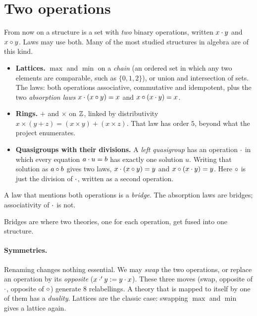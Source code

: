\documentclass[11pt,a4paper]{article}
\begin{document}
\section{Two operations}\label{sec:two}

From now on a structure is a set with \emph{two} binary operations, written $x\cdot y$ and $x\circ y$. Laws may use
both. Many of the most studied structures in algebra are of this kind.
\begin{itemize}
\item \textbf{Lattices.} $\max$ and $\min$ on a \emph{chain} (an ordered set in which any two elements are
  comparable, such as $\{0,1,2\}$), or union and intersection of sets. The
  laws: both operations associative, commutative and idempotent, plus the two \emph{absorption laws}
  $x\cdot(x\circ y)=x$ and $x\circ(x\cdot y)=x$.
\item \textbf{Rings.} $+$ and $\times$ on $\mathbb{Z}$, linked by distributivity $x\times(y+z)=(x\times y)+(x\times z)$. That
  law has order $5$, beyond what the project enumerates.
\item \textbf{Quasigroups with their divisions.} A \emph{left quasigroup} has an operation $\cdot$ in which every
  equation $a\cdot u=b$ has exactly one solution $u$. Writing that solution as $a\circ b$ gives two laws,
  $x\cdot(x\circ y)=y$ and $x\circ(x\cdot y)=y$. Here $\circ$ is just the division of $\cdot$, written as a second
  operation.
\end{itemize}

\begin{definition}
A law that mentions both operations is a \emph{bridge}. The absorption laws are bridges; associativity of $\cdot$ is
not.
\end{definition}

Bridges are where two theories, one for each operation, get fused into one structure.

\paragraph{Symmetries.} Renaming changes nothing essential. We may \emph{swap} the two operations, or replace an
operation by its \emph{opposite} ($x\cdot' y:=y\cdot x$). These three moves (swap, opposite of $\cdot$, opposite of $\circ$)
generate 8 relabellings. A theory that is mapped to itself by one of them has a \emph{duality}. Lattices are the
classic case: swapping $\max$ and $\min$ gives a lattice again.


\end{document}

